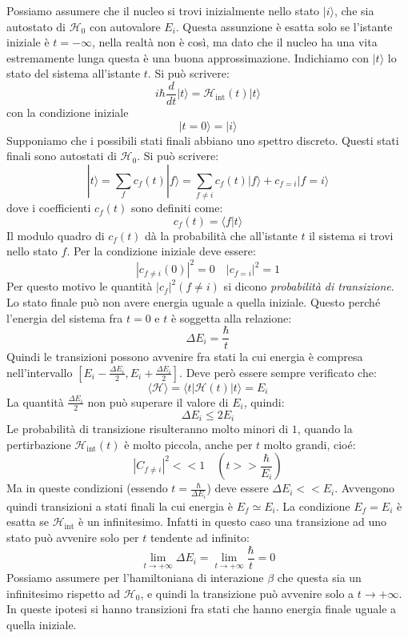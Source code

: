 Possiamo assumere che il nucleo si trovi inizialmente nello stato $|i\rangle$, 
che sia autostato di $\mathcal{H}_0$ con autovalore $E_i$. Questa assunzione è 
esatta solo se l'istante iniziale
è $t=-\infty$, nella realtà non è così, ma dato che il nucleo ha una vita 
estremamente lunga questa è una buona approssimazione. Indichiamo con 
$|t\rangle$ lo stato del sistema
all'istante $t$. Si può scrivere:
\[
i\hbar\frac{d}{dt}|t\rangle=\mathcal{H}_{\text{int}}(t)|t\rangle
\]
con la condizione iniziale
\[
|t=0\rangle=|i\rangle
\]
Supponiamo  che i possibili stati finali abbiano uno 
spettro discreto. Questi stati finali sono autostati di $\mathcal{H}_0$. Si 
può scrivere:
\[
|t\rangle=\sum_fc_f(t)|f\rangle=\sum_{f\neq i}c_f(t)|f\rangle+c_{f= 
i}|f=i\rangle
\]
dove i coefficienti $c_f(t)$ sono definiti come:
\[
c_f(t)=\langle f|t\rangle
\]
Il modulo quadro di $c_f(t)$ dà la probabilità che all'istante $t$ il sistema 
si trovi nello stato $f$. Per la condizione iniziale deve essere:
\[
|c_{f\neq i}(0)|^2=0\quad |c_{f=i}|^2=1
\]
Per questo motivo le quantità $|c_f|^2(f\neq i)$ si dicono 
\textit{probabilità di transizione}. Lo stato finale può non avere energia 
uguale a quella iniziale.
Questo perché l'energia del sistema fra $t=0$ e $t$ è soggetta alla relazione:
\[
\Delta E_i=\frac{\hbar}{t}
\]
Quindi le transizioni possono avvenire fra stati la cui energia è compresa 
nell'intervallo $[E_i-\frac{\Delta E_i}{2},E_i+\frac{\Delta E_i}{2}]$.
Deve però essere sempre verificato che:
\[
\langle\mathcal{H}\rangle=\langle t|\mathcal{H}(t)|t\rangle=E_i
\]
La quantità $\frac{\Delta E_i}{2}$ non può superare il valore di $E_i$, 
quindi:
\[
\Delta E_i\leq2E_i
\]
Le probabilità di transizione risulteranno molto minori di $1$, quando la 
pertirbazione $\mathcal{H}_{\text{int}}(t)$ è molto piccola, anche per $t$ 
molto grandi, cioé:
\[
|C_{f\neq i}|^2<<1\quad(t>>\frac{\hbar}{E_i})
\]
Ma in queste condizioni (essendo $t=\frac{\hbar}{\Delta E_i}$) deve essere 
$\Delta E_i<<E_i$. Avvengono quindi transizioni a stati finali la cui energia 
è $E_f\simeq E_i$.
La condizione $E_f=E_i$ è esatta se $\mathcal{H}_{\text{int}}$ è un 
infinitesimo. Infatti in questo caso una transizione  ad uno stato può 
avvenire solo per $t$ tendente ad infinito:
\[
\lim_{t\rightarrow+\infty}\Delta E_i=\lim_{t\rightarrow+\infty}\frac{\hbar}{t}=0
\]
Possiamo assumere per l'hamiltoniana di interazione $\beta$ che questa sia un 
infinitesimo rispetto ad $\mathcal{H}_0$, e quindi la transizione può avvenire 
solo a $t\rightarrow+\infty$.
In queste ipotesi si hanno transizioni fra stati che hanno energia finale 
uguale a quella iniziale.

